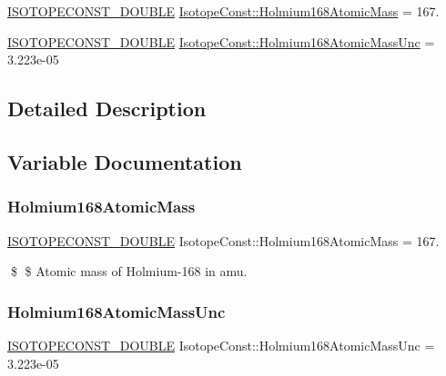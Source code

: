 \begin{DoxyCompactItemize}
\item 
\mbox{\hyperlink{group___isotope_const-_macros_ga8f45a7272ce02c0b4c65c44636ed719a}{I\+S\+O\+T\+O\+P\+E\+C\+O\+N\+S\+T\+\_\+\+D\+O\+U\+B\+LE}} \mbox{\hyperlink{group___isotope_const-_holmium-_ho168_gaa9a460a4ba0f6999c96a8c1ebb0428f0}{Isotope\+Const\+::\+Holmium168\+Atomic\+Mass}} = 167.
\item 
\mbox{\hyperlink{group___isotope_const-_macros_ga8f45a7272ce02c0b4c65c44636ed719a}{I\+S\+O\+T\+O\+P\+E\+C\+O\+N\+S\+T\+\_\+\+D\+O\+U\+B\+LE}} \mbox{\hyperlink{group___isotope_const-_holmium-_ho168_ga696583cd5ae729d9a6019dcafd7edc32}{Isotope\+Const\+::\+Holmium168\+Atomic\+Mass\+Unc}} = 3.\+223e-\/05
\end{DoxyCompactItemize}


\subsection{Detailed Description}


\subsection{Variable Documentation}
\mbox{\label{group___isotope_const-_holmium-_ho168_gaa9a460a4ba0f6999c96a8c1ebb0428f0}} 
\subsubsection{\texorpdfstring{Holmium168\+Atomic\+Mass}{Holmium168AtomicMass}}
{\footnotesize\ttfamily \mbox{\hyperlink{group___isotope_const-_macros_ga8f45a7272ce02c0b4c65c44636ed719a}{I\+S\+O\+T\+O\+P\+E\+C\+O\+N\+S\+T\+\_\+\+D\+O\+U\+B\+LE}} Isotope\+Const\+::\+Holmium168\+Atomic\+Mass = 167.}

\$ \$ Atomic mass of Holmium-\/168 in amu. \mbox{\label{group___isotope_const-_holmium-_ho168_ga696583cd5ae729d9a6019dcafd7edc32}} 
\subsubsection{\texorpdfstring{Holmium168\+Atomic\+Mass\+Unc}{Holmium168AtomicMassUnc}}
{\footnotesize\ttfamily \mbox{\hyperlink{group___isotope_const-_macros_ga8f45a7272ce02c0b4c65c44636ed719a}{I\+S\+O\+T\+O\+P\+E\+C\+O\+N\+S\+T\+\_\+\+D\+O\+U\+B\+LE}} Isotope\+Const\+::\+Holmium168\+Atomic\+Mass\+Unc = 3.\+223e-\/05}

